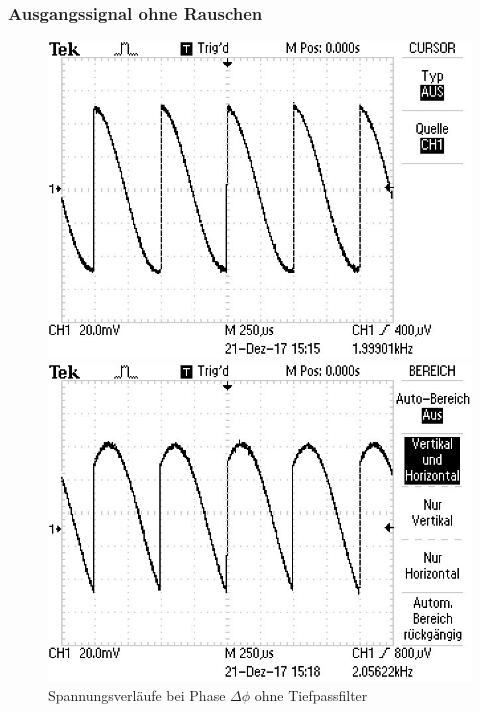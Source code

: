 \subsubsection{Ausgangssignal ohne Rauschen}
\begin{figure}
\centering
\caption{Spannungsverläufe bei Phase $\Delta\phi$ ohne Tiefpassfilter}
\begin{minipage}{0.48\textwidth}
\includegraphics[scale=0.6]{content/images/00.jpg}
\end{minipage}
\begin{minipage}{0.48\textwidth}
\includegraphics[scale=0.6]{content/images/45.jpg}
\end{minipage}

\end{figure}
